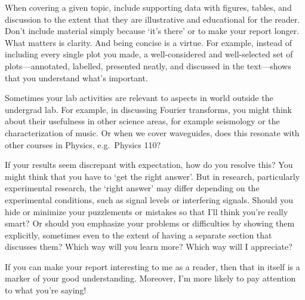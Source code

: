 \documentclass[12pt,preprint]{aastex}
\begin{document}
When covering a given topic, include supporting data with figures,
 tables, and discussion to the extent that they are illustrative and
 educational for the reader. Don't include material simply because `it's
 there' or to make your report longer. What matters is clarity. And
 being concise is a virtue. For example, instead of including every
single plot you made, a well-considered and
 well-selected set of plots---annotated, labelled, presented neatly, and
discussed in the text---shows that you understand what's important.

Sometimes your lab activities are relevant to aspects in world outside
 the undergrad lab. For example, in discussing Fourier transforms, you
 might think about their usefulness in other science areas, for example
 seismology or the characterization of music. Or when we cover
 waveguides, does this resonate with other courses in Physics,
 e.g.\ Physics 110?

If your results seem discrepant with expectation, how do you resolve
this? You might think that  you have to `get the right answer'. But in
research, particularly experimental research, the `right answer' may
differ depending on the experimental conditions, such as signal levels
or interfering signals. Should you hide or minimize your puzzlements or
mistakes so that I'll think you're really smart? Or should you emphasize
your problems or difficulties  by showing them explicitly, sometimes
even to the extent of having a separate section that discusses them?
Which way will you learn more? Which way will I appreciate?

If you can make your report interesting to me as a reader, then that in
 itself is a marker of your good understanding. Moreover, I'm more
 likely to pay attention to what you're saying!
\end{document}
